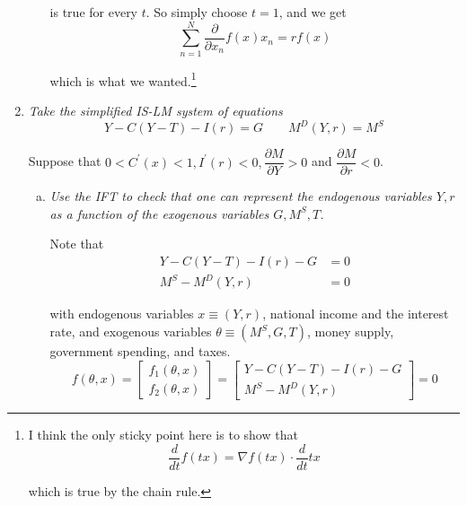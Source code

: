 \documentclass{article}
\begin{document}
\begin{enumerate}[1.]
\begin{enumerate}[a)]
        is true for every $t$. So simply choose $t = 1$, and we get
        \[
          \sum^{N}_{n = 1} \dfrac{\partial}{\partial x_n} f(x) x_n = r f(x)
        \]

        which is what we wanted.\footnote{I think the only sticky point here is to show that
        \[
          \dfrac{d}{dt}f(tx) = \nabla f(tx) \cdot \dfrac{d}{dt} tx
        \]

        which is true by the chain rule.}
    \end{enumerate}

  \item {\itshape
    Take the simplified IS-LM system of equations
    \[
      Y - C(Y - T) - I(r) = G
      \quad\quad
      M^D(Y, r) = M^S
    \]

    Suppose that $0 < C^\prime(x) < 1, I^\prime(r) < 0, \dfrac{\partial M}{\partial Y} > 0$ and $\dfrac{\partial M}{\partial r} < 0$.}
    \begin{enumerate}[a)]
      \item \textit{Use the IFT to check that one can represent the endogenous variables $Y, r$ as a function of the exogenous variables $G, M^S, T$.}

        \solution Note that
          \begin{align*}
            Y - C(Y - T) - I(r) - G & = 0 \\
            M^S - M^D (Y, r)        & = 0
          \end{align*}

          with endogenous variables $x \equiv (Y, r)$, national income and the interest rate, and exogenous variables $\theta \equiv (M^S, G, T)$, money supply, government spending, and taxes.
          \begin{equation}
           \label{eq:is_lm_example}
            f(\theta, x)
            =
            \left[\begin{matrix}
              f_1(\theta, x) \\
              f_2(\theta, x)
            \end{matrix}\right]
            =
            \left[\begin{matrix}
              Y - C(Y - T) - I(r) - G \\
              M^S - M^D (Y, r)
            \end{matrix}\right]
            = 0
          \end{equation}


\end{enumerate}
\end{enumerate}
\end{document}
